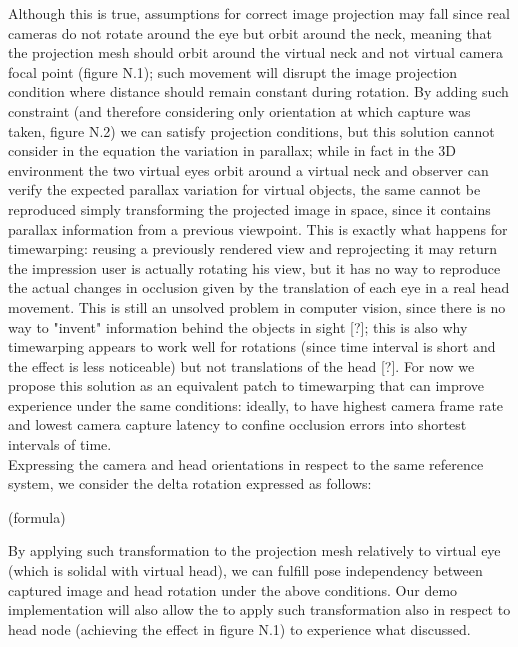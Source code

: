 Although this is true, assumptions for correct image projection may fall since real cameras do not rotate around the eye but orbit around the neck, meaning that the projection mesh should orbit around the virtual neck and not virtual camera focal point (figure N.1); such movement will disrupt the image projection condition where distance should remain constant during rotation. By adding such constraint (and therefore considering only orientation at which capture was taken, figure N.2) we can satisfy projection conditions, but this solution cannot consider in the equation the variation in parallax; while in fact in the 3D environment the two virtual eyes orbit around a virtual neck and observer can verify the expected parallax variation for virtual objects, the same cannot be reproduced simply transforming the projected image in space, since it contains parallax information from a previous viewpoint. This is exactly what happens for timewarping: reusing a previously rendered view and reprojecting it may return the impression user is actually rotating his view, but it has no way to reproduce the actual changes in occlusion given by the translation of each eye in a real head movement. This is still an unsolved problem in computer vision, since there is no way to "invent" information behind the objects in sight [?]; this is also why timewarping appears to work well for rotations (since time interval is short and the effect is less noticeable) but not translations of the head [?]. For now we propose this solution as an equivalent patch to timewarping that can improve experience under the same conditions: ideally, to have highest camera frame rate and lowest camera capture latency to confine occlusion errors into shortest intervals of time.\\
Expressing the camera and head orientations in respect to the same reference system, we consider the delta rotation expressed as follows:

(formula)

By applying such transformation to the projection mesh relatively to virtual eye (which is solidal with virtual head), we can fulfill pose independency between captured image and head rotation under the above conditions. Our demo implementation will also allow the to apply such transformation also in respect to head node (achieving the effect in figure N.1) to experience what discussed.

